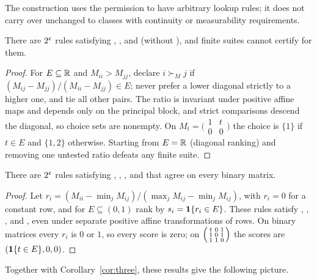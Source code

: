 The construction uses the permission to have arbitrary lookup rules; it does not carry over unchanged
to classes with continuity or measurability requirements.

\begin{proposition}\label{prop:NFB}
There are $2^{\mathfrak{c}}$ rules satisfying , , and  (without ), and finite suites cannot
certify  for them.
\end{proposition}

\begin{proof}
For $E\subseteq\mathbb{R}$ and $M_{ii}>M_{jj}$, declare $i\succ_Mj$ if $(M_{ij}-M_{jj})/(M_{ii}-M_{jj})\in E$; never prefer a
lower diagonal strictly to a higher one, and tie all other pairs. The ratio is invariant under positive
affine maps and depends only on the principal block, and strict comparisons descend the diagonal, so
choice sets are nonempty. On $M_t=\bigl(\begin{smallmatrix}1&t\\0&0\end{smallmatrix}\bigr)$ the choice is
$\{1\}$ if $t\in E$ and $\{1,2\}$ otherwise. Starting from $E=\mathbb{R}$ (diagonal ranking) and removing one
untested ratio defeats any finite suite.
\end{proof}

\begin{proposition}\label{prop:NFSO}
There are $2^{\mathfrak{c}}$ rules satisfying , , , and  that agree on every binary
matrix.
\end{proposition}

\begin{proof}
Let $r_i=(M_{ii}-\min_jM_{ij})/(\max_jM_{ij}-\min_jM_{ij})$, with $r_i=0$ for a constant row, and for
$E\subseteq(0,1)$ rank by $s_i=\mathbf{1}\{r_i\in E\}$. These rules satisfy , , , and , even
under separate positive affine transformations of rows. On binary matrices every $r_i$ is $0$ or $1$,
so every score is zero; on
$\Bigl(\begin{smallmatrix}t&0&1\\1&0&1\\1&1&0\end{smallmatrix}\Bigr)$ the scores are
$(\mathbf{1}\{t\in E\},0,0)$.
\end{proof}

Together with Corollary~\ref{cor:three}, these results give the following picture.

